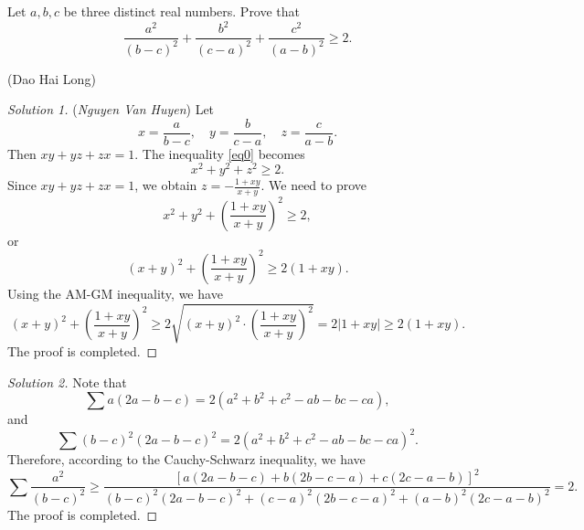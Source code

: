 \documentclass[12pt,a4paper]{book}
\begin{document}
\begin{pro}
Let $a, b, c$ be three distinct real numbers. Prove that
\begin{equation}\label{eq0}
\frac{a^2}{(b-c)^2}+\frac{b^2}{(c-a)^2}+\frac{c^2}{(a-b)^2} \geqslant 2.
\end{equation} 
\begin{flushright}(Dao Hai Long)\end{flushright}
\end{pro}

\begin{proof}[\cmss\problemColor Solution 1]
(\textit{Nguyen Van Huyen}) Let
\[x = \frac{a}{b-c}, \quad y = \frac{b}{c-a}, \quad z = \frac{c}{a-b}.\]
Then $xy+yz+zx=1$. The inequality \eqref{eq0} becomes
\[x^2+y^2+z^2 \ge 2.\]
Since $xy+yz+zx=1$, we obtain $z = -\frac{1+xy}{x+y}$. We need to prove
\[x^2+y^2+\left(\frac{1+xy}{x+y}\right)^2 \ge 2,\]
or
\[(x+y)^2+\left(\frac{1+xy}{x+y}\right)^2 \ge 2(1+xy).\]
Using the AM-GM inequality, we have
\[(x+y)^2+\left(\frac{1+xy}{x+y}\right)^2 \ge 2\sqrt{(x+y)^2 \cdot \left(\frac{1+xy}{x+y}\right)^2} = 2|1+xy| \ge 2(1+xy).\]
The proof is completed.
\end{proof}

\begin{proof}[\cmss\problemColor Solution 2]
Note that
\[\sum a(2a-b-c)=2(a^2+b^2+c^2-ab-bc-ca),\]
and
\[\sum (b-c)^2(2a-b-c)^2=2(a^2+b^2+c^2-ab-bc-ca)^2.\]
Therefore, according to the Cauchy-Schwarz inequality, we have
\[\sum \frac{a^2}{(b-c)^2} \geqslant \frac{\left[a(2a-b-c)+b(2b-c-a)+c(2c-a-b)\right] ^2}{(b-c)^2(2a-b-c)^2+(c-a)^2(2b-c-a)^2+(a-b)^2(2c-a-b)^2}=2.\]
The proof is completed.
\end{proof}
\end{document}
